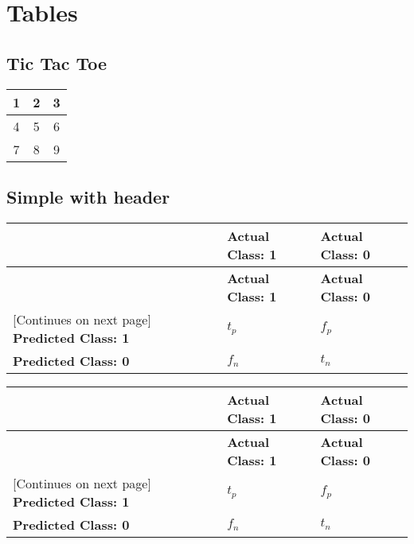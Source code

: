 
\section{Tables}
\subsection{Tic Tac Toe}
\begin{tabular}{c|c|c}
    1 & 2 & 3 \\      \hline
    4 & 5 & 6 \\      \hline
    7 & 8 & 9
\end{tabular}

\subsection{Simple with header}
\begin{tabularx}{\linewidth}{X|X|X}
    \toprule
    \textbf{} & \textbf{Actual Class: 1} & \textbf{Actual Class: 0}\\
    \midrule
    \endfirsthead
    \toprule
    \textbf{} & \textbf{Actual Class: 1} & \textbf{Actual Class: 0}\\
    \midrule
    \endhead
    \footnotesize [Continues on next page]
    \endfoot
    \bottomrule
    \endlastfoot
    \textbf{Predicted Class: 1} & $t_p$ & $f_p$\\ \midrule
    \textbf{Predicted Class: 0} & $f_n$ & $t_n$
\end{tabularx}

\begin{tabularx}{\linewidth}{X|X|X}
    \toprule
    \textbf{} & \textbf{Actual Class: 1} & \textbf{Actual Class: 0}\\
    \hline
    \endfirsthead
    \toprule
    \textbf{} & \textbf{Actual Class: 1} & \textbf{Actual Class: 0}\\
    \hline
    \endhead
    \footnotesize [Continues on next page]
    \endfoot
    \bottomrule
    \endlastfoot
    \textbf{Predicted Class: 1} & $t_p$ & $f_p$\\ \hline
    \textbf{Predicted Class: 0} & $f_n$ & $t_n$
\end{tabularx}

